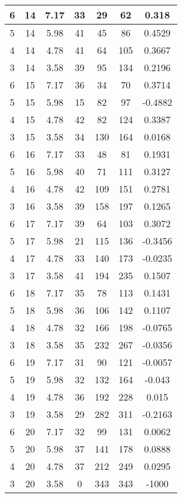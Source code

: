 \documentclass[letterpaper, 12pt]{article}
\begin{document}
\begin{longtable}{|c|c|c|c|c|c|c|}
\hline
6 & 14 & 7.17 & 33 & 29 & 62 & 0.318 \\
\hline
5 & 14 & 5.98 & 41 & 45 & 86 & 0.4529 \\
\hline
4 & 14 & 4.78 & 41 & 64 & 105 & 0.3667 \\
\hline
3 & 14 & 3.58 & 39 & 95 & 134 & 0.2196 \\
\hline
6 & 15 & 7.17 & 36 & 34 & 70 & 0.3714 \\
\hline
5 & 15 & 5.98 & 15 & 82 & 97 & -0.4882 \\
\hline
4 & 15 & 4.78 & 42 & 82 & 124 & 0.3387 \\
\hline
3 & 15 & 3.58 & 34 & 130 & 164 & 0.0168 \\
\hline
6 & 16 & 7.17 & 33 & 48 & 81 & 0.1931 \\
\hline
5 & 16 & 5.98 & 40 & 71 & 111 & 0.3127 \\
\hline
4 & 16 & 4.78 & 42 & 109 & 151 & 0.2781 \\
\hline
3 & 16 & 3.58 & 39 & 158 & 197 & 0.1265 \\
\hline
6 & 17 & 7.17 & 39 & 64 & 103 & 0.3072 \\
\hline
5 & 17 & 5.98 & 21 & 115 & 136 & -0.3456 \\
\hline
4 & 17 & 4.78 & 33 & 140 & 173 & -0.0235 \\
\hline
3 & 17 & 3.58 & 41 & 194 & 235 & 0.1507 \\
\hline
6 & 18 & 7.17 & 35 & 78 & 113 & 0.1431 \\
\hline
5 & 18 & 5.98 & 36 & 106 & 142 & 0.1107 \\
\hline
4 & 18 & 4.78 & 32 & 166 & 198 & -0.0765 \\
\hline
3 & 18 & 3.58 & 35 & 232 & 267 & -0.0356 \\
\hline
6 & 19 & 7.17 & 31 & 90 & 121 & -0.0057 \\
\hline
5 & 19 & 5.98 & 32 & 132 & 164 & -0.043 \\
\hline
4 & 19 & 4.78 & 36 & 192 & 228 & 0.015 \\
\hline
3 & 19 & 3.58 & 29 & 282 & 311 & -0.2163 \\
\hline
6 & 20 & 7.17 & 32 & 99 & 131 & 0.0062 \\
\hline
5 & 20 & 5.98 & 37 & 141 & 178 & 0.0888 \\
\hline
4 & 20 & 4.78 & 37 & 212 & 249 & 0.0295 \\
\hline
3 & 20 & 3.58 & 0 & 343 & 343 & -1000 \\
\hline
\end{longtable}
\end{document}
